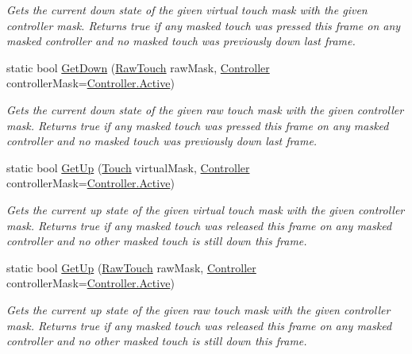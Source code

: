 \begin{DoxyCompactItemize}
\begin{DoxyCompactList}\small\item\em Gets the current down state of the given virtual touch mask with the given controller mask. Returns true if any masked touch was pressed this frame on any masked controller and no masked touch was previously down last frame. \end{DoxyCompactList}\item 
static bool \mbox{\hyperlink{class_o_v_r_input_ae1aeb0251eb70fc326264a720ec2a210}{Get\+Down}} (\mbox{\hyperlink{class_o_v_r_input_a6e130faa2035c5b20853c1177d909cc6}{Raw\+Touch}} raw\+Mask, \mbox{\hyperlink{class_o_v_r_input_a5c86f9052a9cbb0b73779ff5704d60a8}{Controller}} controller\+Mask=\mbox{\hyperlink{class_o_v_r_input_a5c86f9052a9cbb0b73779ff5704d60a8a4d3d769b812b6faa6b76e1a8abaece2d}{Controller.\+Active}})
\begin{DoxyCompactList}\small\item\em Gets the current down state of the given raw touch mask with the given controller mask. Returns true if any masked touch was pressed this frame on any masked controller and no masked touch was previously down last frame. \end{DoxyCompactList}\item 
static bool \mbox{\hyperlink{class_o_v_r_input_a70c67e065dffb7d2ea3cfbb67944a0ea}{Get\+Up}} (\mbox{\hyperlink{class_o_v_r_input_a4e1f1eb856223383aefc1965dd2db39a}{Touch}} virtual\+Mask, \mbox{\hyperlink{class_o_v_r_input_a5c86f9052a9cbb0b73779ff5704d60a8}{Controller}} controller\+Mask=\mbox{\hyperlink{class_o_v_r_input_a5c86f9052a9cbb0b73779ff5704d60a8a4d3d769b812b6faa6b76e1a8abaece2d}{Controller.\+Active}})
\begin{DoxyCompactList}\small\item\em Gets the current up state of the given virtual touch mask with the given controller mask. Returns true if any masked touch was released this frame on any masked controller and no other masked touch is still down this frame. \end{DoxyCompactList}\item 
static bool \mbox{\hyperlink{class_o_v_r_input_a32e849220eb1167615c8e44e7f7cfd41}{Get\+Up}} (\mbox{\hyperlink{class_o_v_r_input_a6e130faa2035c5b20853c1177d909cc6}{Raw\+Touch}} raw\+Mask, \mbox{\hyperlink{class_o_v_r_input_a5c86f9052a9cbb0b73779ff5704d60a8}{Controller}} controller\+Mask=\mbox{\hyperlink{class_o_v_r_input_a5c86f9052a9cbb0b73779ff5704d60a8a4d3d769b812b6faa6b76e1a8abaece2d}{Controller.\+Active}})
\begin{DoxyCompactList}\small\item\em Gets the current up state of the given raw touch mask with the given controller mask. Returns true if any masked touch was released this frame on any masked controller and no other masked touch is still down this frame. \end{DoxyCompactList}\item 

\end{DoxyCompactItemize}
